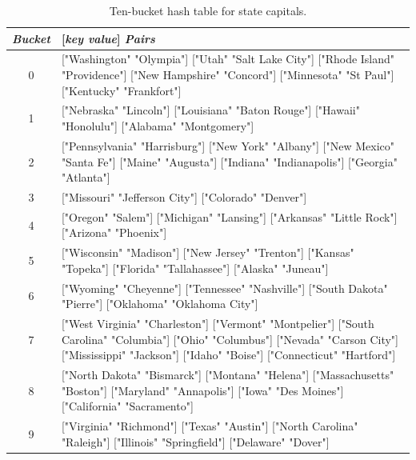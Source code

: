 \begin{table}
\begin{center}
\begin{tabular}{c|p{4in}}
\emph{Bucket} & \textsf{[}\emph{key value}\textsf{]} \emph{Pairs} \\
\hline
0 & \textsf{["Washington" "Olympia"]  ["Utah"  "Salt Lake City"]}  \hfill\break
\textsf{["Rhode Island"  "Providence"]  ["New Hampshire"  "Concord"]}  \hfill\break
\textsf{["Minnesota"  "St Paul"]  ["Kentucky"  "Frankfort"]} \\
\hline
1 & \textsf{["Nebraska"  "Lincoln"] ["Louisiana"  "Baton Rouge"]} \hfill\break
\textsf{["Hawaii"  "Honolulu"]  ["Alabama"  "Montgomery"]} \\
\hline
2 & \textsf{["Pennsylvania"  "Harrisburg"]  ["New York" "Albany"]} \hfill\break
\textsf{["New Mexico"  "Santa Fe"]  ["Maine"  "Augusta"]} \hfill\break
\textsf{["Indiana"  "Indianapolis"]  ["Georgia"  "Atlanta"]} \\
\hline
3 & \textsf{["Missouri"  "Jefferson City"]  ["Colorado"  "Denver"]} \\
\hline
4 & \textsf{["Oregon"  "Salem"]  ["Michigan"  "Lansing"]} \hfill\break
\textsf{["Arkansas"  "Little Rock"]  ["Arizona"  "Phoenix"]} \\
\hline
5 & \textsf{["Wisconsin" "Madison"]  ["New Jersey"  "Trenton"]} \hfill\break
\textsf{["Kansas"  "Topeka"]  ["Florida"  "Tallahassee"]} \hfill\break
\textsf{["Alaska"  "Juneau"]} \\
\hline
6 & \textsf{["Wyoming"  "Cheyenne"]  ["Tennessee"  "Nashville"]} \hfill\break
\textsf{["South Dakota"  "Pierre"]  ["Oklahoma"  "Oklahoma City"]} \\
\hline
7 & \textsf{["West Virginia"  "Charleston"]  ["Vermont"  "Montpelier"]} \hfill\break
\textsf{["South Carolina"  "Columbia"]  ["Ohio"  "Columbus"]} \hfill\break
\textsf{["Nevada"  "Carson City"]  ["Mississippi"  "Jackson"]} \hfill\break
\textsf{["Idaho"  "Boise"]  ["Connecticut"  "Hartford"]} \\
\hline
8 & \textsf{["North Dakota"  "Bismarck"]  ["Montana"  "Helena"]} \hfill\break
\textsf{["Massachusetts"  "Boston"]  ["Maryland"  "Annapolis"]} \hfill\break
\textsf{["Iowa" "Des Moines"]  ["California"  "Sacramento"]} \\
\hline
9 & \textsf{["Virginia"  "Richmond"]  ["Texas" "Austin"]} \hfill\break
\textsf{["North Carolina" "Raleigh"]  ["Illinois"  "Springfield"]} \hfill\break
\textsf{["Delaware"  "Dover"]} \\
\end{tabular}
\end{center}
\caption{Ten-bucket hash table for state capitals.}
\label{table:hash-table-state-capitals}
\end{table}

